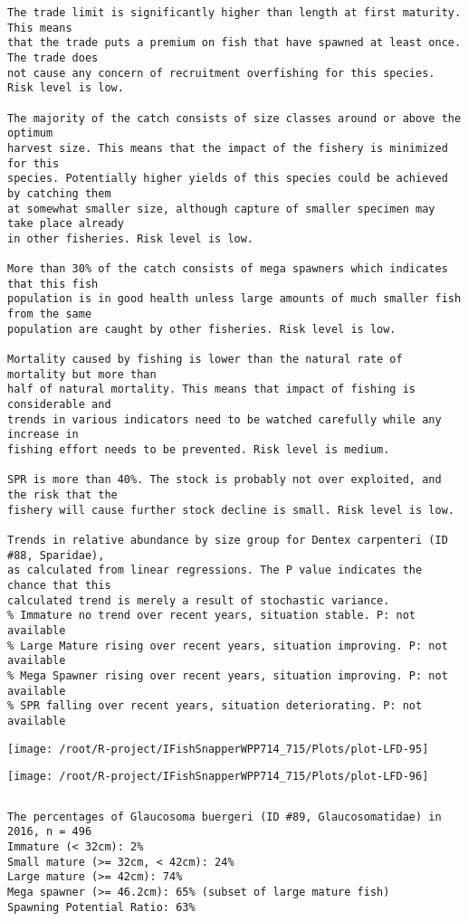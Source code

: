 \documentclass{report}\usepackage[]{graphicx}\usepackage[]{color}
\makeatletter
\def\maxwidth{ %
  \ifdim\Gin@nat@width>\linewidth
    \linewidth
  \else
    \Gin@nat@width
  \fi
}
\newenvironment{kframe}{%
 \def\at@end@of@kframe{}%
 \ifinner\ifhmode%
  \def\at@end@of@kframe{\end{minipage}}%
  \begin{minipage}{\columnwidth}%
 \fi\fi%
 \def\FrameCommand##1{\hskip\@totalleftmargin \hskip-\fboxsep
 \colorbox{shadecolor}{##1}\hskip-\fboxsep
     \hskip-\linewidth \hskip-\@totalleftmargin \hskip\columnwidth}%
 \MakeFramed {\advance\hsize-\width
   \@totalleftmargin\z@ \linewidth\hsize
   \@setminipage}}%
 {\par\unskip\endMakeFramed%
 \at@end@of@kframe}
\newenvironment{knitrout}{}{} %
\makeatother
\begin{document}
\begin{knitrout}
\begin{kframe}
\begin{verbatim}
The trade limit is significantly higher than length at first maturity.  This means
that the trade puts a premium on fish that have spawned at least once. The trade does
not cause any concern of recruitment overfishing for this species. Risk level is low.

The majority of the catch consists of size classes around or above the optimum
harvest size. This means that the impact of the fishery is minimized for this
species. Potentially higher yields of this species could be achieved by catching them
at somewhat smaller size, although capture of smaller specimen may take place already
in other fisheries. Risk level is low.

More than 30% of the catch consists of mega spawners which indicates that this fish
population is in good health unless large amounts of much smaller fish from the same
population are caught by other fisheries. Risk level is low.
 
Mortality caused by fishing is lower than the natural rate of mortality but more than
half of natural mortality. This means that impact of fishing is considerable and
trends in various indicators need to be watched carefully while any increase in
fishing effort needs to be prevented. Risk level is medium.
 
SPR is more than 40%. The stock is probably not over exploited, and the risk that the
fishery will cause further stock decline is small. Risk level is low.
 
Trends in relative abundance by size group for Dentex carpenteri (ID #88, Sparidae),
as calculated from linear regressions. The P value indicates the chance that this
calculated trend is merely a result of stochastic variance.
% Immature no trend over recent years, situation stable. P: not available
% Large Mature rising over recent years, situation improving. P: not available
% Mega Spawner rising over recent years, situation improving. P: not available
% SPR falling over recent years, situation deteriorating. P: not available
\end{verbatim}
\end{kframe}
\texttt{[image: /root/R-project/IFishSnapperWPP714\_715/Plots/plot-LFD-95]} 

\texttt{[image: /root/R-project/IFishSnapperWPP714\_715/Plots/plot-LFD-96]} 
\begin{kframe}\begin{verbatim}
\end{verbatim}
\end{kframe}
\clearpage
\newpage
\begin{kframe}\begin{verbatim}The percentages of Glaucosoma buergeri (ID #89, Glaucosomatidae) in 2016, n = 496
Immature (< 32cm): 2%
Small mature (>= 32cm, < 42cm): 24%
Large mature (>= 42cm): 74%
Mega spawner (>= 46.2cm): 65% (subset of large mature fish)
Spawning Potential Ratio: 63%
 

\end{verbatim}
\end{kframe}
\end{knitrout}
\end{document}
